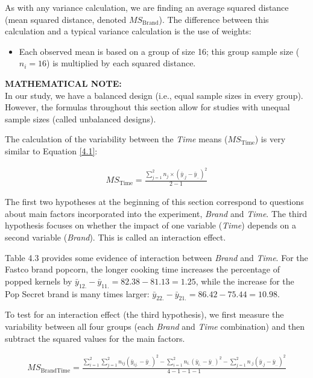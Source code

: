 \documentclass[
]{report}
\providecommand{\tightlist}{%
  \setlength{\itemsep}{0pt}\setlength{\parskip}{0pt}}
\begin{document}
As with any variance calculation, we are finding an average squared distance (mean squared distance, denoted \(MS_{\text{Brand}}\)). The difference between this calculation and a typical variance calculation is the use of weights:

\begin{itemize}
\tightlist
\item
  Each observed mean is based on a group of size 16; this group sample size (\(n_i = 16\)) is multiplied by each squared distance.
\end{itemize}

\large

\textbf{MATHEMATICAL NOTE:}\\
In our study, we have a balanced design (i.e., equal sample sizes in every group). However, the formulas throughout this section allow for studies with unequal sample sizes (called unbalanced designs).
\normalsize

The calculation of the variability between the \emph{Time} means (\(MS_{\text{Time}}\)) is very similar to Equation \ref{4.1}:

\begin{align}\label{4.2}
MS_{\text{Time}} = \frac{\sum_{j=1}^{2} n_j \times (\bar{y}_{.j} - \bar{y}_{..})^2}{2-1}
\tag{4.2}
\end{align}

The first two hypotheses at the beginning of this section correspond to questions about main factors incorporated into the experiment, \emph{Brand} and \emph{Time}. The third hypothesis focuses on whether the impact of one variable (\emph{Time}) depends on a second variable (\emph{Brand}). This is called an interaction effect.

Table 4.3 provides some evidence of interaction between \emph{Brand} and \emph{Time}. For the Fastco brand popcorn, the longer cooking time increases the percentage of popped kernels by \(\bar{y}_{12.} - \bar{y}_{11.} = 82.38 - 81.13 = 1.25\), while the increase for the Pop Secret brand is many times larger: \(\bar{y}_{22.} - \bar{y}_{21.} = 86.42 - 75.44 = 10.98\).

To test for an interaction effect (the third hypothesis), we first measure the variability between all four groups (each \emph{Brand} and \emph{Time} combination) and then subtract the squared values for the main factors.

\begin{align}\label{4.3}
MS_{\text{BrandTime}} = \frac{\sum_{i=1}^{2}\sum_{j=1}^{2} n_{ij}(\bar{y}_{ij.} - \bar{y}_{..})^2 - \sum_{i=1}^{2} n_{i.}(\bar{y}_{i.} - \bar{y}_{..})^2 - \sum_{j=1}^{2} n_{.j}(\bar{y}_{.j} - \bar{y}_{..})^2}{4 - 1 - 1 - 1}
\tag{4.3}
\end{align}
\end{document}
